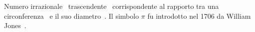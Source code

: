 {Numero irrazionale\pointsto~ trascendente\pointsto~ corrispondente al rapporto tra una circonferenza\pointsto~ e il suo  diametro\pointsto~. Il simbolo $\pi$ fu introdotto nel 1706 da  William Jones\pointsto~.
%
%	
}
